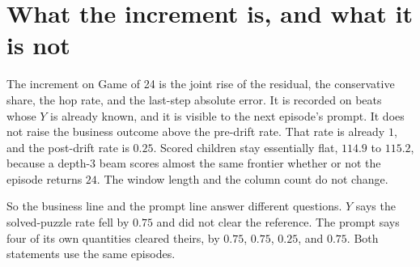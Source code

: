 \documentclass[11pt,a4paper]{article}
\begin{document}
\section{What the increment is, and what it is not}
The increment on Game of 24 is the joint rise of the residual, the conservative share, the hop rate, and the last-step absolute error.
It is recorded on beats whose \(Y\) is already known, and it is visible to the next episode's prompt.
It does not raise the business outcome above the pre-drift rate.
That rate is already \(1\), and the post-drift rate is \(0.25\).
Scored children stay essentially flat, \(114.9\) to \(115.2\), because a depth-3 beam scores almost the same frontier whether or not the episode returns \(24\).
The window length and the column count do not change.

So the business line and the prompt line answer different questions.
\(Y\) says the solved-puzzle rate fell by \(0.75\) and did not clear the reference.
The prompt says four of its own quantities cleared theirs, by \(0.75\), \(0.75\), \(0.25\), and \(0.75\).
Both statements use the same episodes.
\end{document}
